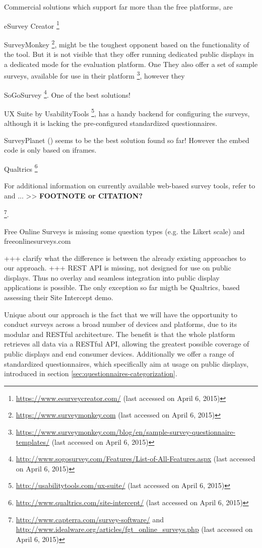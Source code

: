 	Commercial solutions which support far more than the free platforms, are 
	
		eSurvey Creator \footnote{\url{https://www.esurveycreator.com/} (last accessed on April 6, 2015)}

		SurveyMonkey \footnote{\url{https://www.surveymonkey.com} (last accessed on April 6, 2015)}, might be the toughest opponent based on the functionality of the tool. But it is not visible that they offer running dedicated public displays in a dedicated mode for the evaluation platform. One
		They also offer a set of sample surveys, available for use in their platform \footnote{\url{https://www.surveymonkey.com/blog/en/sample-survey-questionnaire-templates/} (last accessed on April 6, 2015)}, however they 

		SoGoSurvey \footnote{\url{http://www.sogosurvey.com/Features/List-of-All-Features.aspx} (last accessed on April 6, 2015)}. One of the best solutions!

		UX Suite by UsabilityTools \footnote{\url{http://usabilitytools.com/ux-suite/} (last accessed on April 6, 2015)}, has a handy backend for configuring the surveys, although it is lacking the pre-configured standardized questionnaires. 

		SurveyPlanet () seems to be the best solution found so far! However the embed code is only based on iframes.

		Qualtrics \footnote{\url{http://www.qualtrics.com/site-intercept/} (last accessed on April 6, 2015)}

		For additional information on currently available web-based survey tools, refer to \cite{Capterra2015SurveyTools} and ... >> \textbf{FOOTNOTE or CITATION?}

		\footnote{\url{http://www.capterra.com/survey-software/} and \url{http://www.idealware.org/articles/fgt_online_surveys.php} (last accessed on April 6, 2015)}.

		Free Online Surveys is missing some question types (e.g. the Likert scale) and freeonlinesurveys.com


	+++ clarify what the difference is between the already existing approaches to our approach.
	+++ REST API is missing, not designed for use on public displays. Thus no overlay and seamless integration into public display applications is possible. The only exception so far migth be Qualtrics, based assessing their Site Intercept demo.




	Unique about our approach is the fact that we will have the opportunity to conduct surveys across a broad number of devices and platforms, due to its modular and RESTful architecture. The benefit is that the whole platform retrieves all data via a RESTful API, allowing the greatest possible coverage of public displays and end consumer devices. Additionally we offer a range of standardized questionnaires, which specifically aim at usage on public displays, introduced in section \ref{sec:questionnaires-categorization}.






